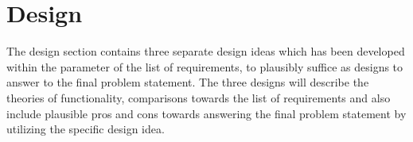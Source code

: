 \section{Design}
The design section contains three separate design ideas which has been developed within the parameter of the list of requirements, to plausibly suffice as designs to answer to the final problem statement. The three designs will describe the theories of functionality, comparisons towards the list of requirements and also include plausible pros and cons towards answering the final problem statement by utilizing the specific design idea.




